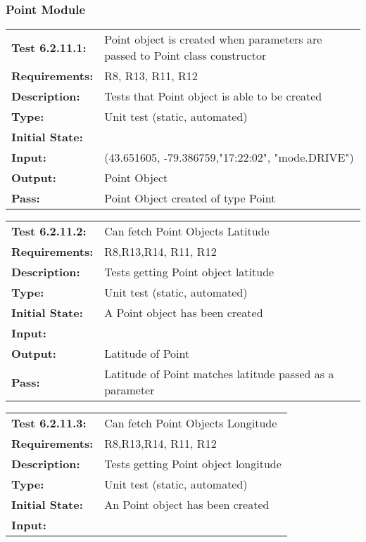 \documentclass[12pt, titlepage]{article}
\begin{document}
{\subsubsection{Point Module}
\begin{tabular}{|l|p{10cm}|}
    \hline
    \bf{Test} 6.2.11.1: & Point object is created when parameters are passed to Point class constructor\\
    \bf{Requirements}: & R8, R13, R11, R12\\
    \bf{Description}: & Tests that Point object is able to be created\\
    \bf{Type}: & Unit test (static, automated) \\
    \bf{Initial State}: & \\
    \bf{Input}: & (43.651605, -79.386759,"17:22:02", "mode.DRIVE") \\
    \bf{Output}: & Point Object\\
    \bf{Pass}: & Point Object created of type Point \\
    \hline
\end{tabular}
\begin{tabular}{|l|p{10cm}|}
    \hline
    \bf{Test} 6.2.11.2: & Can fetch Point Objects Latitude\\
    \bf{Requirements}: &  R8,R13,R14, R11, R12\\
    \bf{Description}: & Tests getting Point object latitude\\
    \bf{Type}: & Unit test (static, automated) \\
    \bf{Initial State}: & A Point object has been created\\
    \bf{Input}: & \\
    \bf{Output}: & Latitude of Point\\
    \bf{Pass}: & Latitude of Point matches latitude passed as a parameter \\
    \hline
\end{tabular}
\begin{tabular}{|l|p{10cm}|}
    \hline
    \bf{Test} 6.2.11.3: & Can fetch Point Objects Longitude\\
    \bf{Requirements}: &  R8,R13,R14, R11, R12\\
    \bf{Description}: & Tests getting Point object longitude\\
    \bf{Type}: & Unit test (static, automated) \\
    \bf{Initial State}: & An Point object has been created\\
    \bf{Input}: & \\

\end{tabular}}
\end{document}
